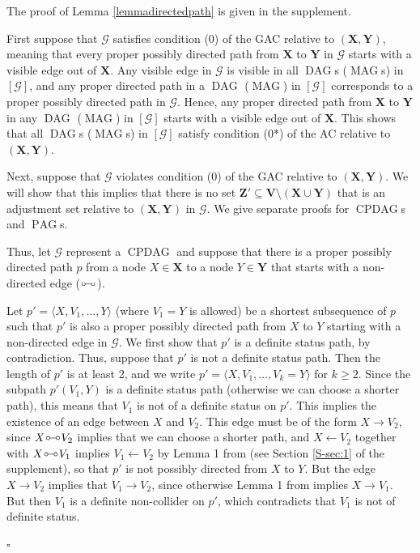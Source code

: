 \documentclass[]{article}
\DeclareMathOperator{\CPDAG}{CPDAG}
\DeclareMathOperator{\DAG}{DAG}
\DeclareMathOperator{\MAG}{MAG}
\DeclareMathOperator{\PAG}{PAG}
\newenvironment{proofsketchamenab}{\noindent{\bf Proof of Lemma \ref{lemmaadjamengen}:}}%
{\hfill $\square$}
\theoremstyle{definition}
\theoremstyle{remark}
\newcommand{\vars}[1][V]{\mathbf{#1}}
\newcommand{\g}[1][G]{\mathcal{#1}}
\newcommand{\circcirc}{
  \setlength{\unitlength}{1mm}
  \begin{picture}(5,1)(0,0)
    \put(1,1){\circle{1}}
    \put(1.5,1){\line(1,0){2}}
    \put(4,1){\circle{1}}
  \end{picture}
}
\begin{document}
The proof of Lemma \ref{lemmadirectedpath} is given in the supplement.

\begin{proofsketchamenab}
   First suppose that $\g$ satisfies condition (0) of the GAC relative to $(\mathbf{X},\mathbf{Y})$, meaning that every proper possibly directed path from $\mathbf{X}$ to $\mathbf{Y}$ in $\g$ starts with a visible edge out of $\mathbf{X}$. Any visible edge in $\g$ is visible in all $\DAG$s ($\MAG$s) in $[\g]$, and any proper directed path in a $\DAG$ ($\MAG$) in $[\g]$ corresponds to a proper possibly directed path in $\g$. Hence, any proper directed path from $\mathbf{X}$ to $\mathbf{Y}$ in any $\DAG$ ($\MAG$) in $[\g]$ starts with a visible edge out of $\mathbf{X}$. This shows that all $\DAG$s ($\MAG$s) in $[\g]$ satisfy condition (0*) of the AC relative to $(\mathbf{X},\mathbf{Y})$.

   Next, suppose that $\g$ violates condition (0) of the GAC relative to $(\mathbf{X},\mathbf{Y})$. We will show that this implies that there is no set $\mathbf{Z}' \subseteq  \vars \setminus (\mathbf{X} \cup \mathbf{Y})$ that is an adjustment set relative to $(\mathbf{X},\mathbf{Y})$ in $\g$.
   We give separate proofs for $\CPDAG$s and $\PAG$s.

   Thus, let $\g$ represent a $\CPDAG$ and suppose that there is a proper possibly directed path $p$ from a node $X \in \mathbf{X}$ to a node $Y \in \mathbf{Y}$ that starts with a non-directed edge ($\circcirc$).

   Let $p' = \langle X, V_1,\dots, Y \rangle$ (where $V_1 = Y$ is allowed) be a shortest subsequence of $p$ such that $p'$ is also a proper possibly directed path from $X$ to $Y$ starting with a non-directed edge in $\g$. We first show that $p'$ is a definite status path, by contradiction. Thus, suppose that $p'$ is not a definite status path. Then the length of $p'$ is at least 2, and we write $p' = \langle X,V_1,\dots,V_k=Y\rangle$ for $k\ge 2$. Since the subpath $p'(V_1,Y)$ is a definite status path (otherwise we can choose a shorter path), this means that $V_1$ is not of a definite status on $p'$. This implies the existence of an edge between $X$ and $V_2$. This edge must be of the form $X \to V_2$, since $X \circcirc V_2$ implies that we can choose a shorter path, and $X \leftarrow V_2$ together with $X \circcirc V_1$ implies $V_1 \leftarrow V_2$  by Lemma 1 from \citet{meek1995causal} (see Section \ref{S-sec:1} of the supplement), so that $p'$ is not possibly directed from $X$ to $Y$. But the edge $X \to V_2$ implies that $V_1 \to V_2$, since otherwise Lemma 1 from \citet{meek1995causal} implies $X \to V_1$. But then $V_1$ is a definite non-collider on $p'$, which contradicts that $V_1$ is not of definite status.


\end{proofsketchamenab}
\end{document}
